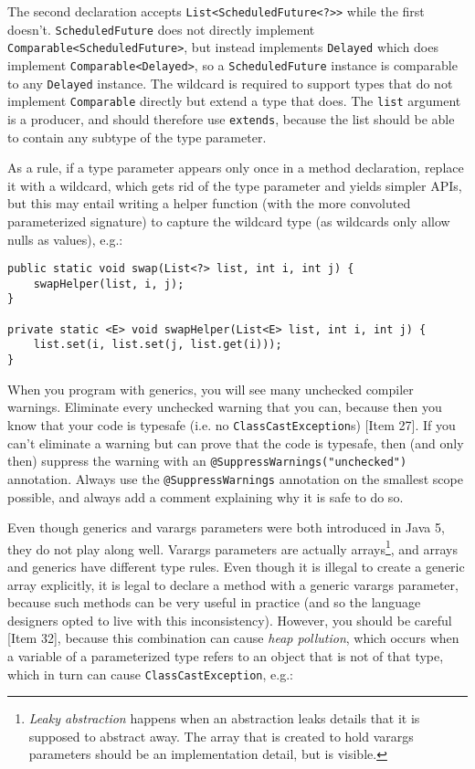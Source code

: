 \documentclass[8pt, table, xcdraw]{article}%
\begin{document}
The second declaration accepts \lstinline{List<ScheduledFuture<?>>} while the first doesn't. \lstinline{ScheduledFuture} does not directly implement \lstinline{Comparable<ScheduledFuture>}, but instead implements \lstinline{Delayed} which does implement \lstinline{Comparable<Delayed>}, so a \lstinline{ScheduledFuture} instance is comparable to any \lstinline{Delayed} instance. The wildcard is required to support types that do not implement \lstinline{Comparable} directly but extend a type that does. The \lstinline{list} argument is a producer, and should therefore use \lstinline{extends}, because the list should be able to contain any subtype of the type parameter.

As a rule, if a type parameter appears only once in a method declaration, replace it with
a wildcard, which gets rid of the type parameter and yields simpler APIs, but this may entail writing a helper function (with the more convoluted parameterized signature) to capture the wildcard type (as wildcards only allow nulls as values), e.g.:

\begin{lstlisting}
public static void swap(List<?> list, int i, int j) {
    swapHelper(list, i, j);
}

private static <E> void swapHelper(List<E> list, int i, int j) {
    list.set(i, list.set(j, list.get(i)));
}
\end{lstlisting}

When you program with generics, you will see many unchecked compiler warnings. Eliminate every unchecked warning that you can, because then you know that your code is typesafe (i.e. no \lstinline{ClassCastException}s) [Item 27]. If you can't eliminate a warning but can prove that the code is typesafe, then (and only then) suppress the warning with an \lstinline{@SuppressWarnings("unchecked")} annotation. Always use the \lstinline{@SuppressWarnings} annotation on the smallest scope possible, and always add a comment explaining why it is safe to do so.

Even though generics and varargs parameters were both introduced in Java 5, they do not play along well. Varargs parameters are actually arrays\footnote{\emph{Leaky abstraction} happens when an abstraction leaks details that it is supposed to abstract away. The array that is created to hold varargs parameters should be an implementation detail, but is visible.}, and arrays and generics have different type rules. Even though it is illegal to create a generic array explicitly, it is legal to declare a method with a generic varargs parameter, because such methods can be very useful in practice (and so the language designers opted to live with this inconsistency). However, you should be careful [Item 32], because this combination can cause \emph{heap pollution}, which occurs when a variable of a parameterized type refers to an object that is not of that type, which in turn can cause \lstinline{ClassCastException}, e.g.:
\end{document}

